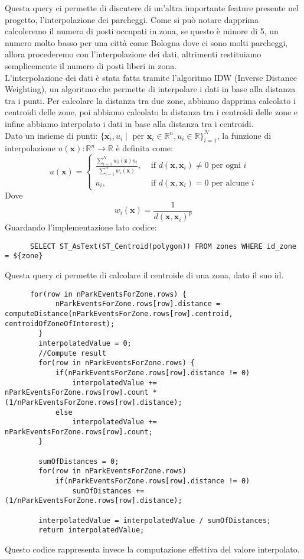 \documentclass[../../Report.tex]{subfiles}
\begin{document}
    Questa query ci permette di discutere di un'altra importante feature presente nel progetto, l'interpolazione dei parcheggi. Come si può notare dapprima calcoleremo il numero di posti occupati in zona, se questo è minore di 5, un numero molto basso per una città come Bologna dove ci sono molti parcheggi, allora procederemo con l'interpolazione dei dati, altrimenti restituiamo semplicemente il numero di posti liberi in zona.\\
    L'interpolazione dei dati è stata fatta tramite l'algoritmo IDW (Inverse Distance Weighting), un algoritmo che permette di interpolare i dati in base alla distanza tra i punti. Per calcolare la distanza tra due zone, abbiamo dapprima calcolato i centroidi delle zone, poi abbiamo calcolato la distanza tra i centroidi delle zone e infine abbiamo interpolato i dati in base alla distanza tra i centroidi.\\
    Dato un insieme di punti:  
    $ \{\mathbf{x}_i, u_i \mid \text{ per } \mathbf{x}_i \in \mathbb{R}^n, u_i \in \mathbb{R}\}_{i=1}^N $, la funzione di interpolazione $u(\mathbf{x}): \mathbb{R}^n \rightarrow \mathbb{R}$ è definita come:
    $$
    u(\mathbf{x})= 
    \begin{cases}
      \frac{\sum_{i=1}^N w_i(\mathbf{z}) u_i}{\sum_{i=1}^N w_i(\mathbf{x})},
       & \text { if } d(\mathbf{x}, \mathbf{x}_i) \neq 0 \text { per ogni  } i \\
      u_i, & \text{ if } d(\mathbf{x}, \mathbf{x}_i)=0 \text{ per alcune } i
    \end{cases}
    $$
    Dove
    $$
    w_i(\mathbf{x})=\frac{1}{d\left(\mathbf{x}, \mathbf{x}_i\right)^p}
    $$
    Guardando l'implementazione lato codice:
    \begin{lstlisting}
      SELECT ST_AsText(ST_Centroid(polygon)) FROM zones WHERE id_zone = ${zone}
    \end{lstlisting}
    Questa query ci permette di calcolare il centroide di una zona, dato il suo id.\\
    \begin{lstlisting}
      for(row in nParkEventsForZone.rows) {
            nParkEventsForZone.rows[row].distance = computeDistance(nParkEventsForZone.rows[row].centroid, centroidOfZoneOfInterest);
        }
        interpolatedValue = 0;
        //Compute result
        for(row in nParkEventsForZone.rows) {
            if(nParkEventsForZone.rows[row].distance != 0)
                interpolatedValue += nParkEventsForZone.rows[row].count * (1/nParkEventsForZone.rows[row].distance);
            else
                interpolatedValue += nParkEventsForZone.rows[row].count;
        }
        
        sumOfDistances = 0;
        for(row in nParkEventsForZone.rows) 
            if(nParkEventsForZone.rows[row].distance != 0)    
                sumOfDistances += (1/nParkEventsForZone.rows[row].distance);
        
        interpolatedValue = interpolatedValue / sumOfDistances;
        return interpolatedValue;
    \end{lstlisting}
    Questo codice rappresenta invece la computazione effettiva del valore interpolato.\\
\end{document}
